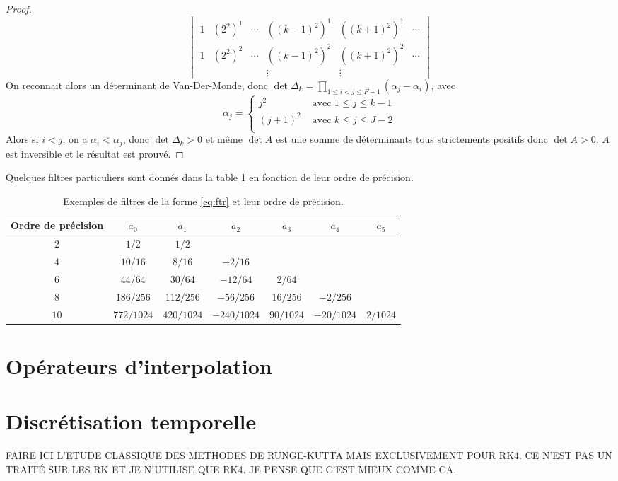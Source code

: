 \begin{proof}
\begin{equation}
\begin{vmatrix}
1 & (2^2)^1 & \cdots & ((k-1)^2)^1 & ((k+1)^2)^1 & \cdots\\
1 & (2^2)^2 & \cdots & ((k-1)^2)^2 & ((k+1)^2)^2 & \cdots\\
&&& \vdots &  \vdots &
\end{vmatrix}
\end{equation}
On reconnait alors un déterminant de Van-Der-Monde, donc $\det \Delta_k = \prod_{1 \leq i < j \leq F-1} \left( \alpha_j - \alpha_i \right)$, avec 
\begin{equation}
\alpha_j = \left\lbrace
\begin{array}{ll}
j^2 & \text{ avec } 1 \leq j \leq k-1\\
(j+1)^2 & \text{ avec } k \leq j \leq J-2\\
\end{array}
\right.
\end{equation}
Alors si $i<j$, on a $\alpha_i < \alpha_j$, donc $\det \Delta_k>0$ et même $\det A$ est une somme de déterminants tous strictements positifs donc $\det A > 0$. $A$ est inversible et le résultat est prouvé.
\end{proof}
Quelques filtres particuliers sont donnés dans la table \ref{tab:filter} en fonction de leur ordre de précision.

\begin{table}[htbp]
\begin{center}
\begin{tabular}{|c||cccccc|}
\hline
\textbf{Ordre de précision} & $a_0$ & $a_1$ & $a_2$ & $a_3$ & $a_4$ & $a_5$ \\
\hline \hline
$2$ & $1/2$ & $1/2$ & & & & \\
\hline
$4$ & $10/16$ & $8/16$ & $-2/16$ & & & \\
\hline
$6$ & $44/64$ & $30/64$ & $-12/64$ & $2/64$ & & \\
\hline
$8$ & $186/256$ & $112/256$ & $-56/256$ & $16/256$ & $-2/256$ & \\
\hline
$10$ & $772/1024$ & $420/1024$ & $-240/1024$ & $90/1024$ & $-20/1024$ & $2/1024$ \\
\hline
\end{tabular}
\end{center}
\caption{Exemples de filtres de la forme \eqref{eq:ftr} et leur ordre de précision.}
\label{tab:filter}
\end{table}
















\section{Opérateurs d'interpolation}


\section{Discrétisation temporelle}


FAIRE ICI L'ETUDE CLASSIQUE DES METHODES DE RUNGE-KUTTA MAIS EXCLUSIVEMENT POUR RK4.
CE N'EST PAS UN TRAITÉ SUR LES RK ET JE N'UTILISE QUE RK4.
JE PENSE QUE C'EST MIEUX COMME CA.
